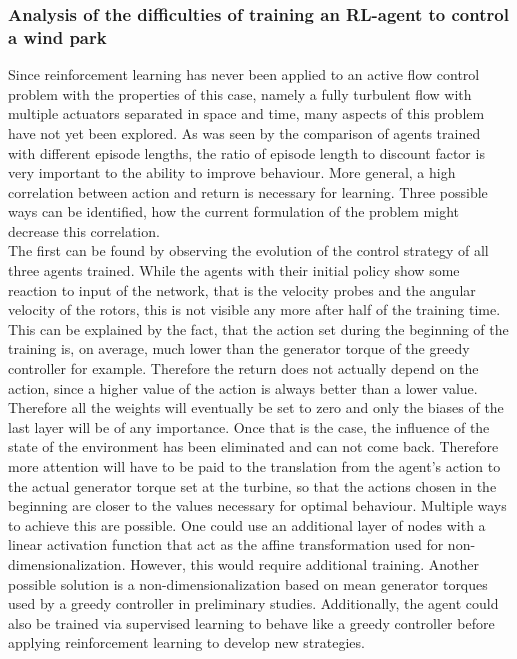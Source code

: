 \subsubsection{Analysis of the difficulties of training an RL-agent to control a wind park}
Since reinforcement learning has never been applied to an active flow control problem with the properties of this case, namely a fully turbulent flow with multiple actuators separated in space and time, many aspects of this problem have not yet been explored.
As was seen by the comparison of agents trained with different episode lengths, the ratio of episode length to discount factor is very important to the ability to improve behaviour. More general, a high correlation between action and return is necessary for learning. Three possible ways can be identified, how the current formulation of the problem might decrease this correlation.  \\ 
The first can be found by observing the evolution of the control strategy of all three agents trained. While the agents with their initial policy show some reaction to input of the network, that is the velocity probes and the angular velocity of the rotors, this is not visible any more after half of the training time. This can be explained by the fact, that the action set during the beginning of the training is, on average, much lower than the generator torque of the greedy controller for example. Therefore the return does not actually depend on the action, since a higher value of the action is always better than a lower value. Therefore all the weights will eventually be set to zero and only the biases of the last layer will be of any importance. Once that is the case, the influence of the state of the environment has been eliminated and can not come back. Therefore more attention will have to be paid to the translation from the agent's action to the actual generator torque set at the turbine, so that the actions chosen in the beginning are closer to the values necessary for optimal behaviour. Multiple ways to achieve this are possible. One could use an additional layer of nodes with a linear activation function that act as the affine transformation used for non-dimensionalization. However, this would require additional training. Another possible solution is a non-dimensionalization based on mean generator torques used by a greedy controller in preliminary studies. Additionally, the agent could also be trained via supervised learning to behave like a greedy controller before applying reinforcement learning to develop new strategies.\\
